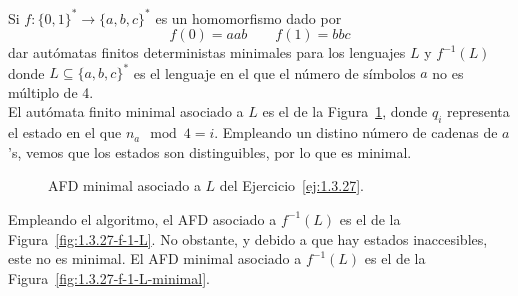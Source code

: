 \begin{ejercicio}\label{ej:1.3.27}
    Si $f:{\{0,1\}}^{\ast}\rightarrow{\{a,b,c\}}^{\ast}$ es un homomorfismo dado por
    \begin{equation*}
        f(0) = aab \qquad f(1) = bbc
    \end{equation*}
    dar autómatas finitos deterministas minimales para los lenguajes $L$ y $f^{-1}(L)$ donde $L\subseteq {\{a,b,c\}}^{\ast}$ es el lenguaje en el que el número de símbolos $a$ no es múltiplo de 4.\\

    El autómata finito minimal asociado a $L$ es el de la Figura~\ref{fig:1.3.27-L}, donde $q_i$ representa el estado en el que $n_a \mod 4 = i$.
    Empleando un distino número de cadenas de $a$'s, vemos que los estados son distinguibles, por lo que es minimal.
    \begin{figure}
        \centering
        \caption{AFD minimal asociado a $L$ del Ejercicio~\ref{ej:1.3.27}.}
        \label{fig:1.3.27-L}
    \end{figure}

    Empleando el algoritmo, el AFD asociado a $f^{-1}(L)$ es el de la Figura~\ref{fig:1.3.27-f-1-L}.
    No obstante, y debido a que hay estados inaccesibles, este no es minimal. El AFD minimal asociado a $f^{-1}(L)$ es el de la Figura~\ref{fig:1.3.27-f-1-L-minimal}.
    \begin{figure}
        \centering
\end{figure}
\end{ejercicio}
